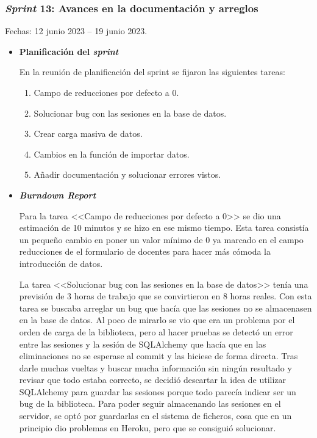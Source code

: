 \subsubsection{\textit{Sprint} 13: Avances en la documentación y arreglos}
Fechas: 12 junio 2023 -- 19 junio 2023.
\begin{itemize}
\item\textbf{Planificación del \textit{sprint}}

En la reunión de planificación del sprint se fijaron las siguientes tareas:
\begin{enumerate}
		\item Campo de reducciones por defecto a 0.
		\item Solucionar bug con las sesiones en la base de datos.
		\item Crear carga masiva de datos.
		\item Cambios en la función de importar datos.
		\item Añadir documentación y solucionar errores vistos.
\end{enumerate}

\item\textbf{\textit{Burndown Report}}

Para la tarea <<Campo de reducciones por defecto a 0>> se dio una estimación de 10 minutos y se hizo en ese mismo tiempo. 
Esta tarea consistía un pequeño cambio en poner un valor mínimo de 0 ya marcado en el campo reducciones de el formulario de docentes para hacer más cómoda la introducción de datos.

La tarea <<Solucionar bug con las sesiones en la base de datos>> tenía una previsión de 3 horas de trabajo que se convirtieron en 8 horas reales.
Con esta tarea se buscaba arreglar un bug que hacía que las sesiones no se almacenasen en la base de datos.
Al poco de mirarlo se vio que era un problema por el orden de carga de la biblioteca, pero al hacer pruebas se detectó un error entre las sesiones y la sesión de SQLAlchemy que hacía que en las eliminaciones no se esperase al commit y las hiciese de forma directa.
Tras darle muchas vueltas y buscar mucha información sin ningún resultado y revisar que todo estaba correcto, se decidió descartar la idea de utilizar SQLAlchemy para guardar las sesiones porque todo parecía indicar ser un bug de la biblioteca.
Para poder seguir almacenando las sesiones en el servidor, se optó por guardarlas en el sistema de ficheros, cosa que en un principio dio problemas en Heroku, pero que se consiguió solucionar.


\end{itemize}
